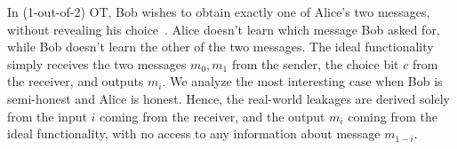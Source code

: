 \documentclass[11pt,hidelinks]{article}
\begin{document}

In (1-out-of-2) OT, Bob wishes to obtain exactly one of Alice's two messages, without revealing his choice~\cite{gmw}. Alice doesn't learn which message Bob asked for, while Bob doesn't learn the other of the two messages. The ideal functionality simply receives the two messages $m_0,m_1$ from the sender, the choice bit $c$ from the receiver, and outputs $m_i$. We analyze the most interesting case when Bob is semi-honest and Alice is honest. Hence, the real-world leakages are derived solely from the input $i$ coming from the receiver, and the output $m_i$ coming from the ideal functionality, with no access to any information about message $m_{1-i}$.
\end{document}
